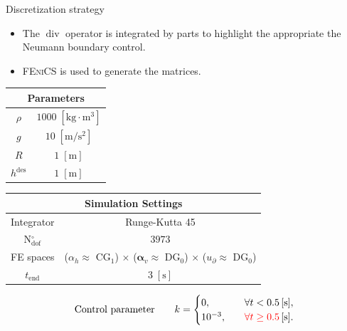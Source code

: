 \documentclass[aspectratio=169]{ISAE-Beamer}
\renewcommand{\div}{\operatorname{div}}
\newcommand{\fenics}{\textsc{FEniCS}\xspace}
\begin{document}
\begin{frame}{Discretization strategy}
	\begin{itemize}
		\item The $\div$ operator is integrated by parts to highlight the appropriate the Neumann boundary control.
		\item \fenics is used to generate the matrices.
	\end{itemize}
	
	\begin{table}[th]
		\centering
		\begin{tabular}{|c|c|}
			\hline 
			\multicolumn{2}{|c|}{Parameters} \\ 
			\hline 
			$\rho$ & $1000\; \mathrm{[kg \cdot m^3]}$ \\ 
			$g$& $10\; \mathrm{[m/s^2]}$ \\ 
			$R$& $1\; \mathrm{[m]}$\\ 
			$h^{\text{des}}$& $1\; \mathrm{[m]}$ \\ 
			\hline 
		\end{tabular} \hspace{.3cm}
		\begin{tabular}{|c|c|}
			\hline 
			\multicolumn{2}{|c|}{Simulation Settings} \\
			\hline 
			Integrator & Runge-Kutta 45 \\
			N$_{\text{dof}}^\circ$ & $3973$ \\
			FE spaces & ($\alpha_h\approx$ CG$_1$) $\times$ ($\bm{\alpha}_v\approx$ DG$_0$) $\times$ ($u_\partial\approx$ DG$_0$)\\
			$t_{\text{end}}$ & $3\; \mathrm{[s]}$\\ 
			\hline 
		\end{tabular} 
	\end{table}
	\vspace{.5cm}
	\begin{equation*}
		\text{Control parameter} \qquad 
		k = 
		\begin{cases}
			0, \quad & \forall t < 0.5 \, [\mathrm{s}], \\
			10^{-3}, \quad & \textcolor{red}{\forall t \ge 0.5} \, [\mathrm{s}].
		\end{cases}
	\end{equation*}
	
\end{frame}
\end{document}
